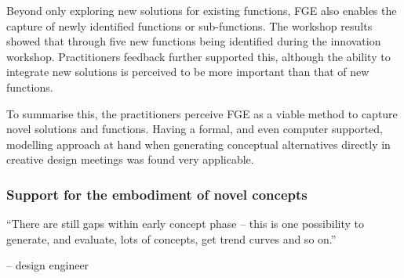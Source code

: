 \documentclass[aerospace,article,submit,moreauthors,pdftex]{Definitions/mdpi}
\begin{document}
Beyond only exploring new solutions for existing functions, \ac{FGE} also enables the capture of newly identified functions or sub-functions.
The workshop results showed that through five new functions being identified during the innovation workshop.
Practitioners feedback further supported this, although the ability to integrate new solutions is perceived to be more important than that of new functions.

To summarise this, the practitioners perceive FGE as a viable method to capture novel solutions and functions.
Having a formal, and even computer  supported, modelling approach at hand when generating conceptual alternatives directly in creative design meetings was found very applicable. 





\subsubsection{Support for the embodiment of novel concepts}




\begin{center}
    “There are still gaps within early concept phase – this is one possibility to generate, and evaluate, lots of concepts, get trend curves and so on.” 
\end{center}
\begin{flushright}
    -- design engineer
\end{flushright}

\end{document}
